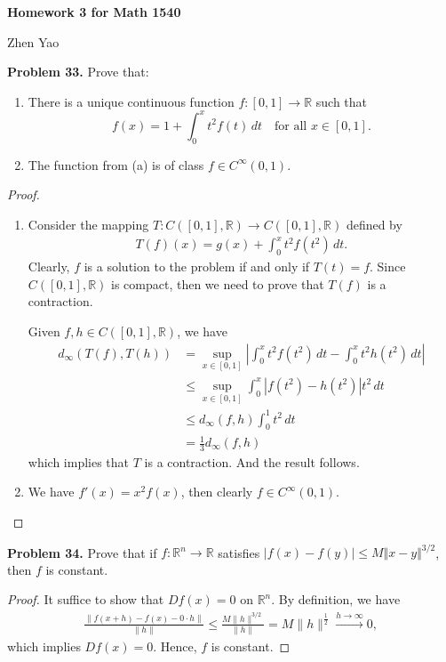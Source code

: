 \documentclass[12pt,leqno]{amsart}
\theoremstyle{definition}
\begin{document}
\centerline{\bf Homework 3 for Math 1540}
\centerline{Zhen Yao}

\bigskip


\noindent
{\bf Problem 33.}
Prove that:
\begin{enumerate}[label=(\alph*)]
    \item There is a unique continuous function $f:[0,1]\to\mathbb{R}$ such that
    $$
    f(x)=1+\int_0^x t^2f(t)\, dt
    \quad
    \text{for all $x\in [0,1]$.}
    $$
    \item
    The function from (a) is of class $f\in C^\infty(0,1)$.
    \end{enumerate}
\begin{proof}
~\begin{enumerate}[label=(\alph*)]
    \item Consider the mapping $T: C([0,1],\mathbb{R})\to C([0,1],\mathbb{R})$ defined by 
    \begin{align*}
        T(f)(x) = g(x) + \int^x_0 t^2 f(t^2)\, dt.
    \end{align*}
    Clearly, $f$ is a solution to the problem if and only if $T(t) = f$. Since $C([0,1],\mathbb{R})$ is compact, then we need to prove that $T(f)$ is a contraction.
    
    Given $f,h \in C([0,1],\mathbb{R})$, we have
    \begin{align*}
        d_\infty(T(f),T(h)) & = \sup_{x\in[0,1]} \left|\int^x_0 t^2 f(t^2)\, dt - \int^x_0 t^2 h(t^2)\, dt\right| \\
        & \leq \sup_{x\in[0,1]} \int^x_0 \left|f(t^2) - h(t^2)\right|t^2\, dt \\
        & \leq d_\infty (f,h) \int^1_0 t^2\, dt \\
        & = \frac{1}{3} d_\infty (f,h)
    \end{align*}
    which implies that $T$ is a contraction. And the result follows.
    
    \item We have $f'(x) = x^2 f(x)$, then clearly $f\in C^\infty(0,1)$.
\end{enumerate}
\end{proof}

\medskip

\noindent
{\bf Problem 34.}
Prove that if $f:\mathbb{R}^n\to\mathbb{R}$ satisfies $|f(x)-f(y)|\leq M\Vert x-y\Vert^{3/2}$, then $f$ is constant.
\begin{proof}
It suffice to show that $Df(x) = 0$ on $\mathbb{R}^n$. By definition, we have 
\begin{align*}
    \frac{\|f(x+h) - f(x) - 0\cdot h\|}{\|h\|} \leq \frac{M \|h\|^{3/2}}{\|h\|} = M \|h\|^{\frac{1}{2}} \xrightarrow[]{h\to\infty} 0,
\end{align*}
which implies $Df(x) = 0$. Hence, $f$ is constant.
\end{proof}
\end{document}
